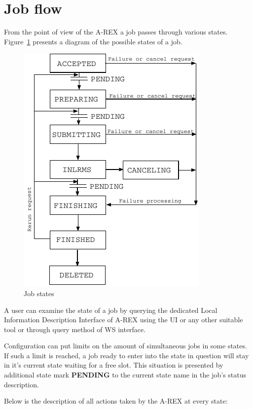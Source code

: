 \documentclass{article}                            %
\begin{document}
\section{Job flow\label{Section:Job Flow}}

From the point of view of the A-REX a job passes through various states.
Figure~\ref{job states diagram} presents a diagram of the possible
states of a job.%

\begin{figure}[th]
\centering \includegraphics{pic1.pdf}
\caption{\label{job states diagram}Job states}
\end{figure}

A user can examine the state of a job by querying the dedicated Local
Information Description Interface of A-REX using the UI or any other
suitable tool or through query method of WS interface. 

Configuration can put limits on the amount of simultaneous jobs in
some states. If such a limit is reached, a job ready to enter into
the state in question will stay in it's current state waiting for
a free slot. This situation is presented by additional state mark
\textbf{PENDING} to the current state name in the job's status description.

Below is the description of all actions taken by the A-REX at every
state:
\end{document}

